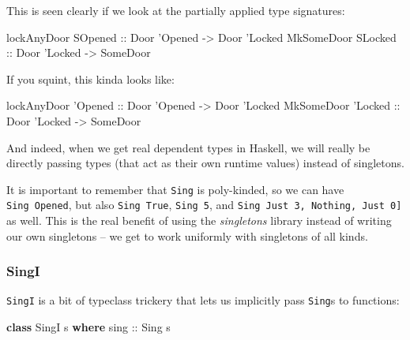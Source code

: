 \documentclass[]{article}
\newenvironment{Shaded}{}{}
\newcommand{\KeywordTok}[1]{\textcolor[rgb]{0.00,0.44,0.13}{\textbf{#1}}}
\newcommand{\DataTypeTok}[1]{\textcolor[rgb]{0.56,0.13,0.00}{#1}}
\newcommand{\CharTok}[1]{\textcolor[rgb]{0.25,0.44,0.63}{#1}}
\newcommand{\OtherTok}[1]{\textcolor[rgb]{0.00,0.44,0.13}{#1}}
\newcommand{\NormalTok}[1]{#1}
\begin{document}
This is seen clearly if we look at the partially applied type signatures:

\begin{Shaded}
\begin{Highlighting}[]
\NormalTok{lockAnyDoor }\DataTypeTok{SOpened}\OtherTok{ ::} \DataTypeTok{Door} \CharTok{'Opened -> Door '}\DataTypeTok{Locked}
\DataTypeTok{MkSomeDoor}  \DataTypeTok{SLocked}\OtherTok{ ::} \DataTypeTok{Door} \CharTok{'Locked -> SomeDoor}
\end{Highlighting}
\end{Shaded}

If you squint, this kinda looks like:

\begin{Shaded}
\begin{Highlighting}[]
\NormalTok{lockAnyDoor }\CharTok{'Opened :: Door '}\DataTypeTok{Opened} \OtherTok{->} \DataTypeTok{Door} \CharTok{'Locked}
\DataTypeTok{MkSomeDoor}  \CharTok{'Locked :: Door '}\DataTypeTok{Locked} \OtherTok{->} \DataTypeTok{SomeDoor}
\end{Highlighting}
\end{Shaded}

And indeed, when we get real dependent types in Haskell, we will really be
directly passing types (that act as their own runtime values) instead of
singletons.

It is important to remember that \texttt{Sing} is poly-kinded, so we can have
\texttt{Sing\ \textquotesingle{}Opened}, but also
\texttt{Sing\ \textquotesingle{}True}, \texttt{Sing\ 5}, and
\texttt{Sing\ \textquotesingle{}{[}\textquotesingle{}Just\ 3,\ \textquotesingle{}Nothing,\ \textquotesingle{}Just\ 0{]}}
as well. This is the real benefit of using the \emph{singletons} library instead
of writing our own singletons -- we get to work uniformly with singletons of all
kinds.

\subsubsection{SingI}\label{singi}

\texttt{SingI} is a bit of typeclass trickery that lets us implicitly pass
\texttt{Sing}s to functions:

\begin{Shaded}
\begin{Highlighting}[]
\KeywordTok{class} \DataTypeTok{SingI}\NormalTok{ s }\KeywordTok{where}
\OtherTok{    sing ::} \DataTypeTok{Sing}\NormalTok{ s}
\end{Highlighting}
\end{Shaded}
\end{document}
